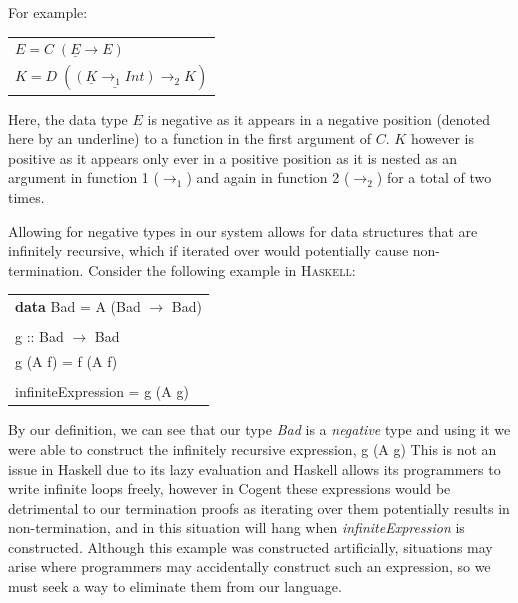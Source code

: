 For example:

\begin{center}
    \begin{tabular}{l}
        $E = C\; (\underline{E} \rightarrow E)$ \\
        $K = D\; (\underline{(\underline{K} \rightarrow_1 Int)} \rightarrow_2 K)$
    \end{tabular} 
\end{center}

Here, the data type $E$ is negative as it appears in a negative position (denoted here by an underline)
to a function in the first argument of $C$.
$K$ however is positive as it appears only ever in a positive position as it is nested as an argument
in function 1 ($\rightarrow_1$) and again in function 2 ($\rightarrow_2$) for a total of two times.

Allowing for negative types in our system allows for data structures that are infinitely recursive,
which if iterated over would potentially cause non-termination. Consider
the following example in \textsc{Haskell}:

\begin{center}
    \begin{tabular}{l}
            \textbf{data} \textsf{Bad = A (Bad $\rightarrow$ Bad)} \\ \\

            \textsf{g :: Bad $\rightarrow$ Bad} \\
            \textsf{g (A f) = f (A f)} \\ \\

            \textsf{infiniteExpression = g (A g)}
    \end{tabular} 
\end{center}

By our definition, we can see that our type \textit{Bad} is a \textit{negative} type and using it we were able
to construct the infinitely recursive expression, \textsf{g (A g)}
This is not an issue in Haskell due to its lazy evaluation and Haskell allows its programmers to write
infinite loops freely, however in Cogent these expressions would be detrimental to our termination
proofs as iterating over them potentially results in non-termination, and in this
situation will hang when \textit{infiniteExpression} is constructed.
Although this example was constructed artificially, situations may arise where
programmers may accidentally construct such an expression, so we must seek a way to
eliminate them from our language.

